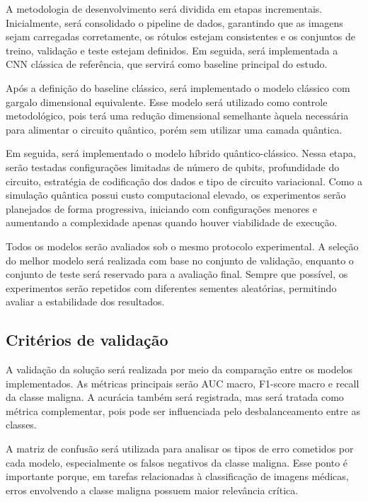 \documentclass[
    12pt,
    openright,
    oneside,
    a4paper,
    english,
    brazil
]{abntex2}
\begin{document}
A metodologia de desenvolvimento será dividida em etapas incrementais. Inicialmente, será consolidado o pipeline de dados, garantindo que as imagens sejam carregadas corretamente, os rótulos estejam consistentes e os conjuntos de treino, validação e teste estejam definidos. Em seguida, será implementada a CNN clássica de referência, que servirá como baseline principal do estudo.

Após a definição do baseline clássico, será implementado o modelo clássico com gargalo dimensional equivalente. Esse modelo será utilizado como controle metodológico, pois terá uma redução dimensional semelhante àquela necessária para alimentar o circuito quântico, porém sem utilizar uma camada quântica.

Em seguida, será implementado o modelo híbrido quântico-clássico. Nessa etapa, serão testadas configurações limitadas de número de qubits, profundidade do circuito, estratégia de codificação dos dados e tipo de circuito variacional. Como a simulação quântica possui custo computacional elevado, os experimentos serão planejados de forma progressiva, iniciando com configurações menores e aumentando a complexidade apenas quando houver viabilidade de execução.

Todos os modelos serão avaliados sob o mesmo protocolo experimental. A seleção do melhor modelo será realizada com base no conjunto de validação, enquanto o conjunto de teste será reservado para a avaliação final. Sempre que possível, os experimentos serão repetidos com diferentes sementes aleatórias, permitindo avaliar a estabilidade dos resultados.

\subsection{Critérios de validação}
\label{subsec:criterios_validacao}

A validação da solução será realizada por meio da comparação entre os modelos implementados. As métricas principais serão AUC macro, F1-score macro e recall da classe maligna. A acurácia também será registrada, mas será tratada como métrica complementar, pois pode ser influenciada pelo desbalanceamento entre as classes.

A matriz de confusão será utilizada para analisar os tipos de erro cometidos por cada modelo, especialmente os falsos negativos da classe maligna. Esse ponto é importante porque, em tarefas relacionadas à classificação de imagens médicas, erros envolvendo a classe maligna possuem maior relevância crítica.
\end{document}
